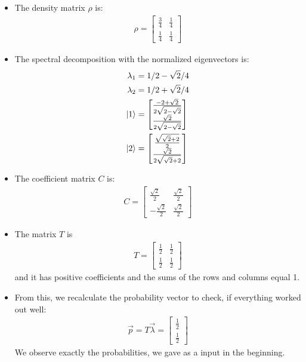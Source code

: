 \documentclass{article}
\begin{document}
\begin{itemize}
    \item The density matrix $\rho$ is:
    \begin{align}
        \rho = \left[\begin{matrix}\frac{3}{4} & \frac{1}{4}\\\frac{1}{4} & \frac{1}{4}\end{matrix}\right]
    \end{align}
    \item The spectral decomposition with the normalized eigenvectors is:
    \begin{align}
        \lambda_1 &= 1/2 - \sqrt{2}/4 \\
        \lambda_2 &= 1/2 + \sqrt{2}/4 \\
        \ket{1} &= \left[\begin{matrix}\frac{-2 + \sqrt{2}}{2 \sqrt{2 - \sqrt{2}}}\\\frac{\sqrt{2}}{2 \sqrt{2 - \sqrt{2}}}\end{matrix}\right]\\
        \ket{2} &= \left[\begin{matrix}\frac{\sqrt{\sqrt{2} + 2}}{2}\\\frac{\sqrt{2}}{2 \sqrt{\sqrt{2} + 2}}\end{matrix}\right]
        \end{align}
    \item The coefficient matrix $C$ is:
    \begin{align}
        C = \left[\begin{matrix}\frac{\sqrt{2}}{2} & \frac{\sqrt{2}}{2}\\- \frac{\sqrt{2}}{2} & \frac{\sqrt{2}}{2}\end{matrix}\right]
    \end{align}
    \item The matrix $T$ is
    \begin{align}
        T = \left[\begin{matrix}\frac{1}{2} & \frac{1}{2}\\\frac{1}{2} & \frac{1}{2}\end{matrix}\right]
    \end{align}
        and it has positive coefficients and the sums of the rows and columns equal 1.
    \item From this, we recalculate the probability vector to check, if everything worked out well:
    \begin{align}
        \vec{p} = T \vec{\lambda} = \left[\begin{matrix}\frac{1}{2}\\\frac{1}{2}\end{matrix}\right]
    \end{align}
    We observe exactly the probabilities, we gave as a input in the beginning.
\end{itemize}
\end{document}
